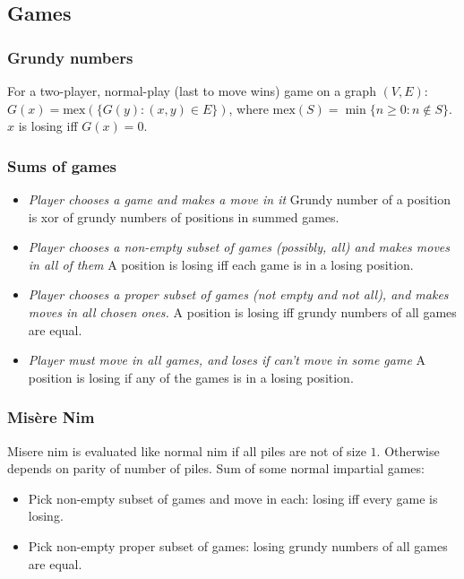 \begin{small}
\subsection{Games}

\subsubsection{Grundy numbers}
For a two-player, normal-play (last to move wins) game on a graph $(V,E)$:
$G(x) = \mbox{mex}(\{ G(y) : (x, y) \in E \})$,
where $\mbox{mex}(S) = \min \{ n \ge 0: n \not\in S \}$.
$x$ is losing iff $G(x) = 0$.

\subsubsection{Sums of games}
\begin{itemize}[noitemsep]
  \item
    \emph{Player chooses a game and makes a move in it}
    Grundy number of a position is xor of grundy numbers of positions in summed games.
  \item
    \emph{Player chooses a non-empty subset of games (possibly, all) and makes moves in all of them}
    A position is losing iff each game is in a losing position.
  \item
    \emph{Player chooses a proper subset of games (not empty and not all),
        and makes moves in all chosen ones.}
    A position is losing iff grundy numbers of all games are equal.
  \item
    \emph{Player must move in all games, and loses if can't move in some game}
    A position is losing if any of the games is in a losing position.
\end{itemize}

\subsubsection{Mis\`{e}re Nim}
Misere nim is evaluated like normal nim if all piles are not of size $1$. Otherwise depends on parity of number of piles. Sum of some normal impartial games:
\begin{itemize}[noitemsep]
  \item Pick non-empty subset of games and move in each: losing iff every game is losing.
  \item Pick non-empty proper subset of games: losing grundy numbers of all games are equal.
\end{itemize}


\end{small}
